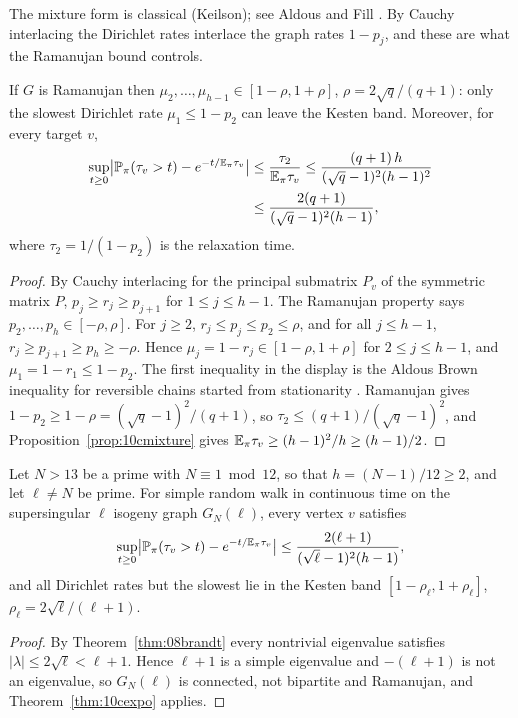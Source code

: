 The mixture form is classical (Keilson); see Aldous and Fill \cite{aldousfill}. By Cauchy interlacing the Dirichlet rates interlace the graph rates $1-p_j$, and these are what the Ramanujan bound controls.

\begin{theorem}\label{thm:10cexpo}
If $G$ is Ramanujan then $\mu_2,\dots,\mu_{h-1}\in[1-\rho,1+\rho]$, $\rho=2\sqrt q/(q+1)$: only the slowest Dirichlet rate $\mu_1\le1-p_2$ can leave the Kesten band. Moreover, for every target $v$,
\begin{align*}
\sup_{t\ge0}\bigl|\mathbb{P}_\pi(\tau_v>t)-e^{-t/\mathbb{E}_\pi\tau_v}\bigr|&\le\frac{\tau_2}{\mathbb{E}_\pi\tau_v}\le\frac{(q+1)\,h}{(\sqrt q-1)^2(h-1)^2}\\
&\le\frac{2(q+1)}{(\sqrt q-1)^2(h-1)},
\end{align*}
where $\tau_2=1/(1-p_2)$ is the relaxation time.
\end{theorem}

\begin{proof}
By Cauchy interlacing for the principal submatrix $P_v$ of the symmetric matrix $P$, $p_j\ge r_j\ge p_{j+1}$ for $1\le j\le h-1$. The Ramanujan property says $p_2,\dots,p_h\in[-\rho,\rho]$. For $j\ge2$, $r_j\le p_j\le p_2\le\rho$, and for all $j\le h-1$, $r_j\ge p_{j+1}\ge p_h\ge-\rho$. Hence $\mu_j=1-r_j\in[1-\rho,1+\rho]$ for $2\le j\le h-1$, and $\mu_1=1-r_1\le1-p_2$. The first inequality in the display is the Aldous Brown inequality for reversible chains started from stationarity \cite{aldousbrown1992,aldousfill}. Ramanujan gives $1-p_2\ge1-\rho=(\sqrt q-1)^2/(q+1)$, so $\tau_2\le(q+1)/(\sqrt q-1)^2$, and Proposition~\ref{prop:10cmixture} gives $\mathbb{E}_\pi\tau_v\ge(h-1)^2/h\ge(h-1)/2$.
\end{proof}

\begin{corollary}\label{cor:10cisogeny}
Let $N>13$ be a prime with $N\equiv1\bmod12$, so that $h=(N-1)/12\ge2$, and let $\ell\ne N$ be prime. For simple random walk in continuous time on the supersingular $\ell$ isogeny graph $G_N(\ell)$, every vertex $v$ satisfies
\[
\sup_{t\ge0}\bigl|\mathbb{P}_\pi(\tau_v>t)-e^{-t/\mathbb{E}_\pi\tau_v}\bigr|\le\frac{2(\ell+1)}{(\sqrt\ell-1)^2(h-1)},
\]
and all Dirichlet rates but the slowest lie in the Kesten band $[1-\rho_\ell,1+\rho_\ell]$, $\rho_\ell=2\sqrt\ell/(\ell+1)$.
\end{corollary}

\begin{proof}
By Theorem~\ref{thm:08brandt} every nontrivial eigenvalue satisfies $|\lambda|\le2\sqrt\ell<\ell+1$. Hence $\ell+1$ is a simple eigenvalue and $-(\ell+1)$ is not an eigenvalue, so $G_N(\ell)$ is connected, not bipartite and Ramanujan, and Theorem~\ref{thm:10cexpo} applies.
\end{proof}

